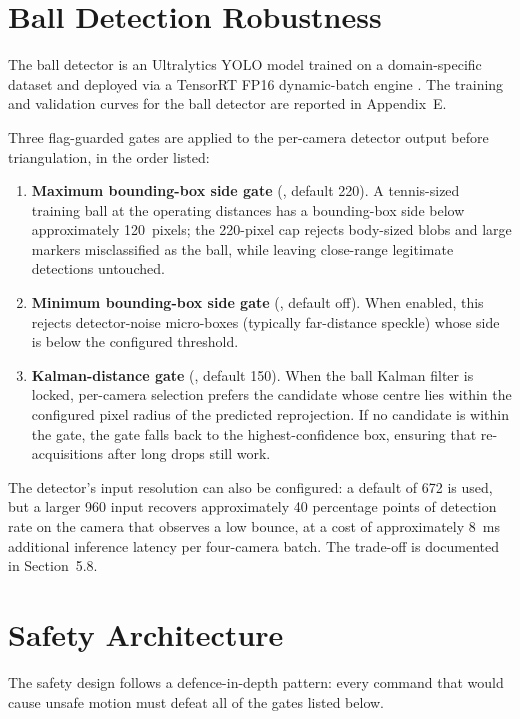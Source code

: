 \section{Ball Detection Robustness}

The ball detector is an Ultralytics YOLO model trained on a domain-specific dataset and deployed via a TensorRT FP16 dynamic-batch engine \cite{ref38_tensorrt}. The training and validation curves for the ball detector are reported in Appendix~E.

Three flag-guarded gates are applied to the per-camera detector output before triangulation, in the order listed:

\begin{enumerate}
    \item \textbf{Maximum bounding-box side gate} (\texttt{}, default 220). A tennis-sized training ball at the operating distances has a bounding-box side below approximately 120~pixels; the 220-pixel cap rejects body-sized blobs and large markers misclassified as the ball, while leaving close-range legitimate detections untouched.
    \item \textbf{Minimum bounding-box side gate} (\texttt{}, default off). When enabled, this rejects detector-noise micro-boxes (typically far-distance speckle) whose side is below the configured threshold.
    \item \textbf{Kalman-distance gate} (\texttt{}, default 150). When the ball Kalman filter is locked, per-camera selection prefers the candidate whose centre lies within the configured pixel radius of the predicted reprojection. If no candidate is within the gate, the gate falls back to the highest-confidence box, ensuring that re-acquisitions after long drops still work.
\end{enumerate}

The detector's input resolution can also be configured: a default of 672 is used, but a larger 960 input recovers approximately 40 percentage points of detection rate on the camera that observes a low bounce, at a cost of approximately 8~ms additional inference latency per four-camera batch. The trade-off is documented in Section~5.8.

\section{Safety Architecture}

The safety design follows a defence-in-depth pattern: every command that would cause unsafe motion must defeat all of the gates listed below.

